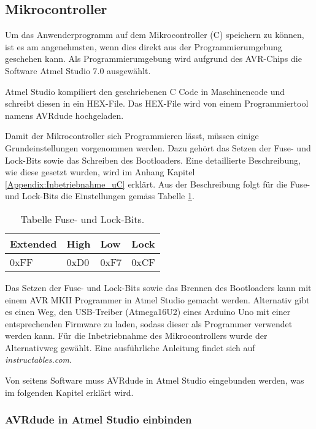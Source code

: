 \newpage
\subsection{Mikrocontroller}
\label{subsec:Inbetriebnahme_Mikrocontroller}

Um das Anwenderprogramm auf dem Mikrocontroller (\textmu C) speichern zu können, ist es am angenehmsten, wenn dies direkt aus der Programmierumgebung geschehen kann. Als Programmierumgebung wird aufgrund des AVR-Chips die Software Atmel Studio 7.0 ausgewählt.

Atmel Studio kompiliert den geschriebenen C Code in Maschinencode und schreibt diesen in ein HEX-File. Das HEX-File wird von einem Programmiertool namens AVRdude hochgeladen.\cite{verschiedene_autoren_avrdude_2019}


Damit der Mikrocontroller sich Programmieren lässt, müssen einige Grundeinstellungen vorgenommen werden. Dazu gehört das Setzen der Fuse- und Lock-Bits sowie das Schreiben des Bootloaders. Eine detaillierte Beschreibung, wie diese gesetzt wurden, wird im Anhang Kapitel \ref{Appendix:Inbetriebnahme_uC} erklärt. Aus der Beschreibung folgt für die Fuse- und Lock-Bits die Einstellungen gemäss Tabelle \ref{tab:Fuse_und_Lock-Bits}.

\begin{table}[h!]
\center
\begin{tabular}{|l|l|l|l|}
\hline
\textbf{Extended} & \textbf{High} & \textbf{Low} & \textbf{Lock}\\
\hline
0xFF & 0xD0 & 0xF7 & 0xCF\\
\hline
\end{tabular}
\caption{Tabelle Fuse- und Lock-Bits.}
\label{tab:Fuse_und_Lock-Bits}
\end{table}

Das Setzen der Fuse- und Lock-Bits sowie das Brennen des Bootloaders kann mit einem AVR MKII Programmer in Atmel Studio gemacht werden. Alternativ gibt es einen Weg, den USB-Treiber (Atmega16U2) eines Arduino Uno mit einer entsprechenden Firmware zu laden, sodass dieser als Programmer verwendet werden kann. Für die Inbetriebnahme des Mikrocontrollers wurde der Alternativweg gewählt. Eine ausführliche Anleitung findet sich auf \textit{instructables.com}. \cite{vidmofollow_turn_2017}

Von seitens Software muss AVRdude in Atmel Studio eingebunden werden, was im folgenden Kapitel erklärt wird.

\subsubsection{AVRdude in Atmel Studio einbinden}\label{subsubsec:avrdude_in_atmelstudio_einbinden}

